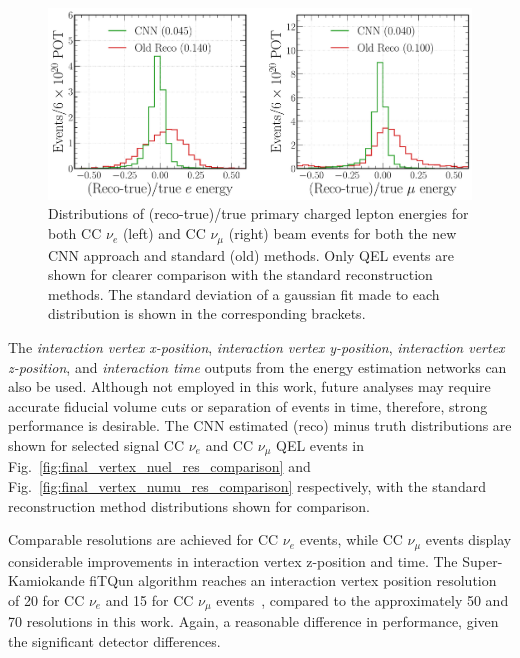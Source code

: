 \begin{figure} %
    \includegraphics[width=\textwidth]{diagrams/7-results/final_frac_e_comparison.pdf}
    \caption[Distributions of (reco-true)/true primary charged lepton energies for the CNN and standard methods]
    {Distributions of (reco-true)/true primary charged lepton energies for both CC $\nu_{e}$
        (left) and CC $\nu_{\mu}$ (right) beam events for both the new CNN approach and standard
        (old) methods. Only QEL events are shown for clearer comparison with the standard
        reconstruction methods. The standard deviation of a gaussian fit made to each distribution
        is shown in the corresponding brackets.}
    \label{fig:final_frac_e_comparison}
\end{figure}

The \emph{interaction vertex x-position}, \emph{interaction vertex y-position}, \emph{interaction
    vertex z-position}, and \emph{interaction time} outputs from the energy estimation networks
can also be used. Although not employed in this work, future analyses may require accurate
fiducial volume cuts or separation of events in time, therefore, strong performance is
desirable. The CNN estimated (reco) minus truth distributions are shown for selected signal CC
$\nu_{e}$ and CC $\nu_{\mu}$ QEL events in Fig.~\ref{fig:final_vertex_nuel_res_comparison} and
Fig.~\ref{fig:final_vertex_numu_res_comparison} respectively, with the standard reconstruction
method distributions shown for comparison.

Comparable resolutions are achieved for CC $\nu_{e}$ events, while CC $\nu_{\mu}$ events display
considerable improvements in interaction vertex z-position and time. The Super-Kamiokande fiTQun
algorithm reaches an interaction vertex position resolution of \unit{20}{} for CC
$\nu_{e}$ and \unit{15}{} for CC $\nu_{\mu}$ events~\cite{jiang2019}, compared to the
approximately \unit{50}{} and \unit{70}{} resolutions in this work. Again, a
reasonable difference in performance, given the significant detector differences.

